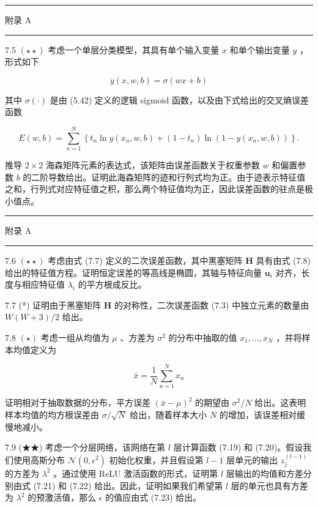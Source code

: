 \documentclass[10pt]{report}
\newcommand{\HRule}{\begin{center}\rule{0.9\linewidth}{0.2mm}\end{center}}
\begin{document}
\HRule

附录 A

\HRule

7.5 \(\left( {\star  \star  }\right)\) 考虑一个单层分类模型，其具有单个输入变量 \(x\) 和单个输出变量 \(y\) ，形式如下

\[
y\left( {x,w,b}\right)  = \sigma \left( {{wx} + b}\right)  \tag{7.63}
\]

其中 \(\sigma \left( \cdot \right)\) 是由 (5.42) 定义的逻辑 sigmoid 函数，以及由下式给出的交叉熵误差函数

\[
E\left( {w,b}\right)  = \mathop{\sum }\limits_{{n = 1}}^{N}\left\{  {{t}_{n}\ln y\left( {{x}_{n},w,b}\right)  + \left( {1 - {t}_{n}}\right) \ln \left( {1 - y\left( {{x}_{n},w,b}\right) }\right) }\right\}  . \tag{7.64}
\]

推导 \(2 \times  2\) 海森矩阵元素的表达式，该矩阵由误差函数关于权重参数 \(w\) 和偏置参数 \(b\) 的二阶导数给出。证明此海森矩阵的迹和行列式均为正。由于迹表示特征值之和，行列式对应特征值之积，那么两个特征值均为正，因此误差函数的驻点是极小值点。

\HRule

附录 A

\HRule

7.6 \(\left( {\star  \star  }\right)\) 考虑由式 (7.7) 定义的二次误差函数，其中黑塞矩阵 \(\mathbf{H}\) 具有由式 (7.8) 给出的特征值方程。证明恒定误差的等高线是椭圆，其轴与特征向量 \({\mathbf{u}}_{i}\) 对齐，长度与相应特征值 \({\lambda }_{i}\) 的平方根成反比。

7.7 (*) 证明由于黑塞矩阵 \(\mathbf{H}\) 的对称性，二次误差函数 (7.3) 中独立元素的数量由 \(W\left( {W + 3}\right) /2\) 给出。

7.8 \(\left( \star \right)\) 考虑一组从均值为 \(\mu\) 、方差为 \({\sigma }^{2}\) 的分布中抽取的值 \({x}_{1},\ldots ,{x}_{N}\) ，并将样本均值定义为

\[
\bar{x} = \frac{1}{N}\mathop{\sum }\limits_{{n = 1}}^{N}{x}_{n} \tag{7.65}
\]

证明相对于抽取数据的分布，平方误差 \({\left( \bar{x} - \mu \right) }^{2}\) 的期望由 \({\sigma }^{2}/N\) 给出。这表明样本均值的均方根误差由 \(\sigma /\sqrt{N}\) 给出，随着样本大小 \(N\) 的增加，该误差相对缓慢地减小。

7.9 (★★) 考虑一个分层网络，该网络在第 \(l\) 层计算函数 (7.19) 和 (7.20)。假设我们使用高斯分布 \(\mathcal{N}\left( {0,{\epsilon }^{2}}\right)\) 初始化权重，并且假设第 \(l - 1\) 层单元的输出 \({z}_{j}^{\left( l - 1\right) }\) 的方差为 \({\lambda }^{2}\) 。通过使用 ReLU 激活函数的形式，证明第 \(l\) 层输出的均值和方差分别由式 (7.21) 和 (7.22) 给出。因此，证明如果我们希望第 \(l\) 层的单元也具有方差为 \({\lambda }^{2}\) 的预激活值，那么 \(\epsilon\) 的值应由式 (7.23) 给出。
\end{document}
